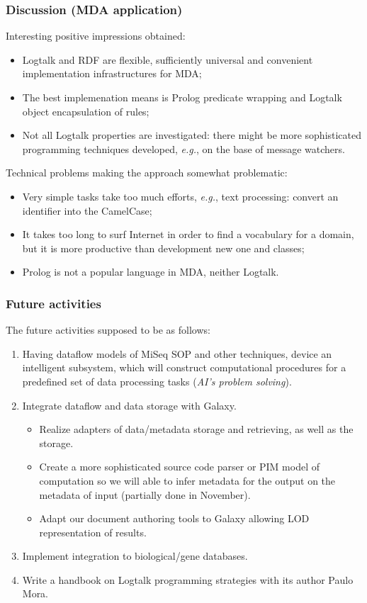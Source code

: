 \documentclass[10pt]{beamer}
\begin{document}
\begin{frame}
  \frametitle{Discussion (MDA application)}
  Interesting positive impressions obtained:
  \begin{itemize}
  \item Logtalk and RDF are flexible, sufficiently universal and convenient implementation infrastructures for MDA;
  \item The best implemenation means is Prolog predicate wrapping and Logtalk object encapsulation of rules;
  \item Not all Logtalk properties are investigated: there might be more sophisticated programming techniques developed, \emph{e.g.}, on the base of message watchers.
  \end{itemize}
  Technical problems making the approach somewhat problematic:
  \begin{itemize}
  \item Very simple tasks take too much efforts, \emph{e.g.}, text processing: convert an identifier into the CamelCase;
  \item It takes too long to surf Internet in order to find a vocabulary for a domain, but it is more productive than development new one and classes;
  \item Prolog is not a popular language in MDA, neither Logtalk.
  \end{itemize}
\end{frame}

\begin{frame}
  \frametitle{Future activities}
  The future activities supposed to be as follows:
  \begin{enumerate}
  \item Having dataflow models of MiSeq SOP and other techniques, device an intelligent subsystem, which will construct computational procedures for a predefined set of data processing tasks (\emph{AI's problem solving}).
  \item Integrate dataflow and data storage with Galaxy.
    \begin{itemize}
       \item Realize adapters of data/metadata storage and retrieving, as well as the storage.
       \item Create a more sophisticated source code parser or PIM model of computation so we will able to infer metadata for the output on the metadata of input (partially done in November).
       \item Adapt our document authoring tools to Galaxy allowing LOD representation of results.
  \end{itemize}
  \item Implement integration to biological/gene databases.
  \item Write a handbook on Logtalk programming strategies with its author Paulo Mora.
  \end{enumerate}
\end{frame}
\end{document}
